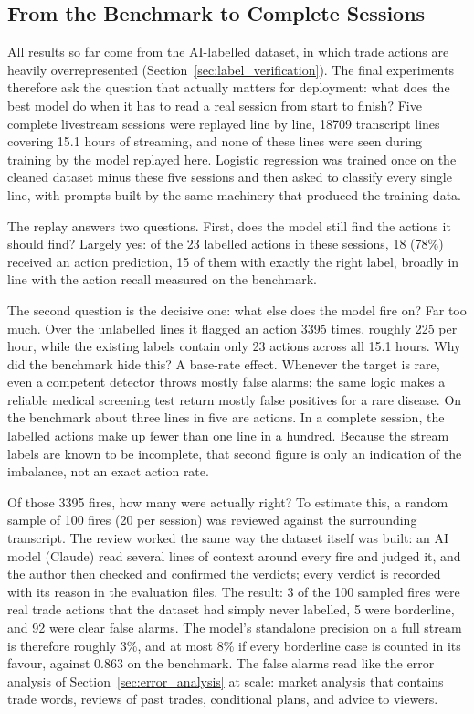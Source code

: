 \subsection{From the Benchmark to Complete Sessions}
\label{sec:fullstream}

All results so far come from the AI-labelled dataset, in which trade actions are heavily overrepresented (Section~\ref{sec:label_verification}). The final experiments therefore ask the question that actually matters for deployment: what does the best model do when it has to read a real session from start to finish? Five complete livestream sessions were replayed line by line, 18709 transcript lines covering 15.1 hours of streaming, and none of these lines were seen during training by the model replayed here. Logistic regression was trained once on the cleaned dataset minus these five sessions and then asked to classify every single line, with prompts built by the same machinery that produced the training data.

The replay answers two questions. First, does the model still find the actions it should find? Largely yes: of the 23 labelled actions in these sessions, 18 (78\%) received an action prediction, 15 of them with exactly the right label, broadly in line with the action recall measured on the benchmark.

The second question is the decisive one: what else does the model fire on? Far too much. Over the unlabelled lines it flagged an action 3395 times, roughly 225 per hour, while the existing labels contain only 23 actions across all 15.1 hours. Why did the benchmark hide this? A base-rate effect. Whenever the target is rare, even a competent detector throws mostly false alarms; the same logic makes a reliable medical screening test return mostly false positives for a rare disease. On the benchmark about three lines in five are actions. In a complete session, the labelled actions make up fewer than one line in a hundred. Because the stream labels are known to be incomplete, that second figure is only an indication of the imbalance, not an exact action rate.

Of those 3395 fires, how many were actually right? To estimate this, a random sample of 100 fires (20 per session) was reviewed against the surrounding transcript. The review worked the same way the dataset itself was built: an AI model (Claude) read several lines of context around every fire and judged it, and the author then checked and confirmed the verdicts; every verdict is recorded with its reason in the evaluation files. The result: 3 of the 100 sampled fires were real trade actions that the dataset had simply never labelled, 5 were borderline, and 92 were clear false alarms. The model's standalone precision on a full stream is therefore roughly 3\%, and at most 8\% if every borderline case is counted in its favour, against 0.863 on the benchmark. The false alarms read like the error analysis of Section~\ref{sec:error_analysis} at scale: market analysis that contains trade words, reviews of past trades, conditional plans, and advice to viewers.

